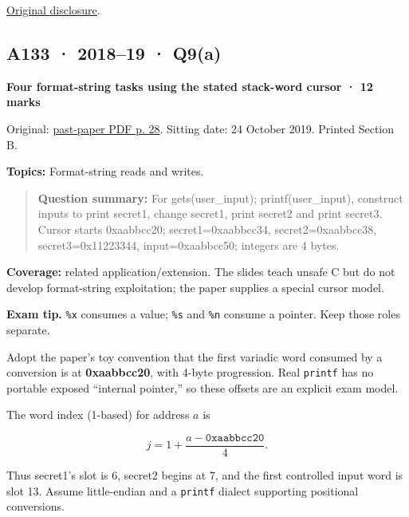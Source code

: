 \documentclass[11pt,a4paper]{article}
\begin{document}
\href{https://www.heartbleed.com/}{Original disclosure}.




\clearpage
\subsection{A133 · 2018–19 · Q9(a)}\label{a133}

\textbf{Four format-string tasks using the stated stack-word cursor · 12 marks}


Original: \href{../../CSE405-Security_Merged.pdf\#page=28}{past-paper PDF p. 28}. Sitting date: 24 October 2019. Printed Section B.


\textbf{Topics:} Format-string reads and writes.



\begin{quote}\small

\textbf{Question summary:} For gets(user\_input); printf(user\_input),\allowbreak{} construct inputs to print secret1,\allowbreak{} change secret1,\allowbreak{} print secret2 and print secret3. Cursor starts 0xaabbcc20; secret1=\allowbreak{}0xaabbcc34,\allowbreak{} secret2=\allowbreak{}0xaabbcc38,\allowbreak{} secret3=\allowbreak{}0x11223344,\allowbreak{} input=\allowbreak{}0xaabbcc50; integers are 4 bytes.



\end{quote}

\textbf{Coverage:} related application/\allowbreak{}extension. The slides teach unsafe C but do not develop format-string exploitation; the paper supplies a special cursor model.



{\color{ForestGreen}\textbf{Exam tip.} \texttt{\%x} consumes a value; \texttt{\%s} and \texttt{\%n} consume a pointer. Keep those roles separate.}


Adopt the paper's toy convention that the first variadic word consumed by a conversion is at \textbf{0xaabbcc20},\allowbreak{} with 4-byte progression. Real \texttt{printf} has no portable exposed “internal pointer,\allowbreak{}” so these offsets are an explicit exam model.


The word index (1-based) for address \(a\) is



\[
j=1+\frac{a-\mathtt{0xaabbcc20}}4.
\]

Thus secret1's slot is 6,\allowbreak{} secret2 begins at 7,\allowbreak{} and the first controlled input word is slot 13. Assume little-endian and a \texttt{printf} dialect supporting positional conversions.
\end{document}
